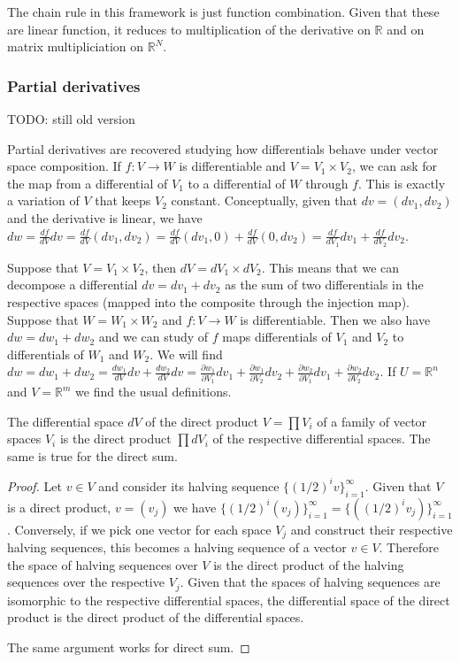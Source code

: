 \begin{remark}
	The chain rule in this framework is just function combination. Given that these are linear function, it reduces to multiplication of the derivative on $\mathbb{R}$ and on matrix multipliciation on $\mathbb{R}^N$.
\end{remark}


\subsubsection{Partial derivatives}

TODO: still old version

Partial derivatives are recovered studying how differentials behave under vector space composition. If $f : V \to W$ is differentiable and $V = V_1 \times V_2$, we can ask for the map from a differential of $V_1$ to a differential of $W$ through $f$. This is exactly a variation of $V$ that keeps $V_2$ constant. Conceptually, given that $dv = (dv_1, dv_2)$ and the derivative is linear, we have $dw = \frac{df}{dV} dv = \frac{df}{dV} (dv_1, dv_2) = \frac{df}{dV} (dv_1, 0) + \frac{df}{dV} (0, dv_2) = \frac{df}{dV_1} dv_1 + \frac{df}{dV_2} dv_2$.
	
Suppose that $V = V_1 \times V_2$, then $dV = dV_1 \times dV_2$. This means that we can decompose a differential $dv= dv_1 + dv_2$ as the sum of two differentials in the respective spaces (mapped into the composite through the injection map). Suppose that $W = W_1 \times W_2$ and $f : V \to W$ is differentiable. Then we also have $dw= dw_1 + dw_2$ and we can study of $f$ maps differentials of $V_1$ and $V_2$ to differentials of $W_1$ and $W_2$. We will find $dw = dw_1 + dw_2 = \frac{dw_1}{dV} dv + \frac{dw_2}{dV} dv = \frac{\partial w_1}{\partial V_1} dv_1 + \frac{\partial w_1}{\partial V_2} dv_2 + \frac{\partial w_2}{\partial V_1} dv_1 + \frac{\partial w_2}{\partial V_2} dv_2$. If $U = \mathbb{R}^n$ and $V = \mathbb{R}^m$ we find the usual definitions.

\begin{prop}
	The differential space $dV$ of the direct product $V=\prod V_i$ of a family of vector spaces $V_i$ is the direct product $\prod dV_i$ of the respective differential spaces. The same is true for the direct sum.
\end{prop}

\begin{proof}
	Let $v \in V$ and consider its halving sequence $\{(1/2)^i v\}_{i=1}^{\infty}$. Given that $V$ is a direct product, $v=(v_j)$ we have $\{(1/2)^i (v_j)\}_{i=1}^{\infty} = \{((1/2)^i v_j)\}_{i=1}^{\infty}$. Conversely, if we pick one vector for each space $V_j$ and construct their respective halving sequences, this becomes a halving sequence of a vector $v \in V$. Therefore the space of halving sequences over $V$ is the direct product of the halving sequences over the respective $V_j$. Given that the spaces of halving sequences are isomorphic to the respective differential spaces, the differential space of the direct product is the direct product of the differential spaces.
	
	The same argument works for direct sum.
\end{proof}

